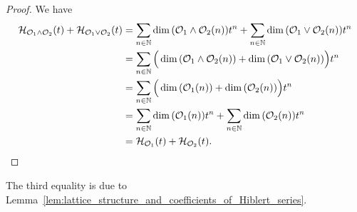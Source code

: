 \begin{proof}
  We have
  \[\begin{split}
  \mathcal{H}_{\mathcal{O}_1\wedge\mathcal{O}_2}(t)+\mathcal{H}_{\mathcal{O}_1\vee\mathcal{O}_2}(t)&=\sum_{n\in\mathbb{N}}\dim{\left(\mathcal{O}_1\wedge\mathcal{O}_2(n)\right)}t^n+\sum_{n\in\mathbb{N}}\dim{\left(\mathcal{O}_1\vee\mathcal{O}_2(n)\right)}t^n\\
  &=\sum_{n\in\mathbb{N}}\Big(\dim{\left(\mathcal{O}_1\wedge\mathcal{O}_2(n)\right)}+\dim{\left(\mathcal{O}_1\vee\mathcal{O}_2(n)\right)}\Big)t^n\\
  &=\sum_{n\in\mathbb{N}}\Big(\dim{\left(\mathcal{O}_1(n)\right)}+\dim{\left(\mathcal{O}_2(n)\right)}\Big)t^n\\
  &=\sum_{n\in\mathbb{N}}\dim{\left(\mathcal{O}_1(n)\right)}t^n+\sum_{n\in\mathbb{N}}\dim{\left(\mathcal{O}_2(n)\right)}t^n\\
  &=\mathcal{H}_{\mathcal{O}_1}(t)+\mathcal{H}_{\mathcal{O}_2}(t).
  \end{split}\]
\end{proof}
The third equality is due to Lemma~\ref{lem:lattice_structure_and_coefficients_of_Hiblert_series}.

